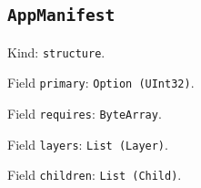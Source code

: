 \documentclass[11pt]{article}
\begin{document}
\subsection*{\texttt{AppManifest}}
\noindent Kind: \texttt{structure}.\par
\noindent Field \texttt{primary}: \texttt{Option (UInt32)}.\par
\noindent Field \texttt{requires}: \texttt{ByteArray}.\par
\noindent Field \texttt{layers}: \texttt{List (Layer)}.\par
\noindent Field \texttt{children}: \texttt{List (Child)}.\par
\end{document}
